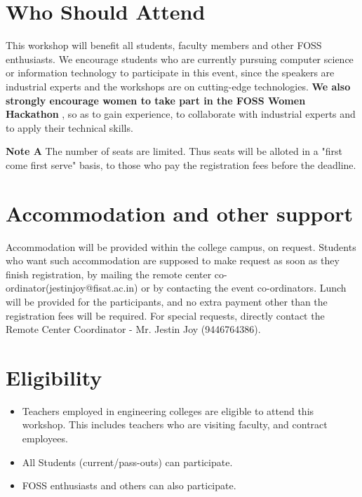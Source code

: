 \documentclass[notuble,10pt,a4paper]{leaflet}
\begin{document}
\section{{\Large Who Should Attend}}
This workshop will benefit all students, faculty members and other FOSS enthusiasts. We encourage students who are currently pursuing computer science or information technology to participate in this event, since the speakers are industrial experts and the workshops are on cutting-edge technologies.\textbf{ We also strongly encourage women to take part in the FOSS Women Hackathon }, so as to gain experience, to collaborate with industrial experts and to apply their technical skills.

\textbf{\newline
Note A}
The number of seats are limited. Thus seats will be alloted in a "first come first serve" basis, to those who pay the registration fees before the deadline.


\section{{\Large Accommodation and other support}}

Accommodation will be provided within the college campus, on request. Students who want such accommodation are supposed to make request as soon as they finish registration, by mailing the remote center co-ordinator(jestinjoy@fisat.ac.in) or by contacting the event co-ordinators. Lunch will be provided for the participants, and no extra payment other than the registration fees will be required. For special requests, directly contact the Remote Center Coordinator - Mr. Jestin Joy (9446764386).

\newpage
\section{{\Large Eligibility}}

\begin{itemize}
\item Teachers employed in engineering colleges are eligible to attend this workshop. This includes teachers who are visiting faculty, and contract employees.
\item All Students (current/pass-outs) can participate.
\item FOSS enthusiasts and others can also participate.
\end{itemize}
\end{document}
